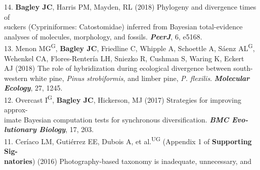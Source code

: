 \documentclass[margin,line]{res}
\begin{document}
\begin{resume}
14. \textbf{Bagley JC}, Harris PM, Mayden, RL (2018) Phylogeny and divergence times of\\
\hspace*{8mm} suckers (Cypriniformes: Catostomidae) inferred from Bayesian total-evidence\\ \vspace{2mm}
\hspace*{8mm}analyses of molecules, morphology, and fossils. {\it \textbf{PeerJ}}, 6, e5168. \\ %
13. Menon MG\textsuperscript{G}, \textbf{Bagley JC}, Friedline C, Whipple A, Schoettle A, S\'{a}enz AL\textsuperscript{G},\\ 
\hspace*{8mm} Wehenkel CA, Flores-Renter\'{i}a LH, Sniezko R, Cushman S, Waring K, Eckert\\
\hspace*{8mm} AJ (2018) The role of hybridization during ecological divergence between south-\\
\hspace*{8mm} western white pine, {\it Pinus strobiformis}, and limber pine, {\it P. flexilis}. {\it \textbf{Molecular}\\ \vspace{2mm}
\hspace*{8mm}\textbf{Ecology}}, 27, 1245. \\ %
12. Overcast I\textsuperscript{G}, \textbf{Bagley JC}, Hickerson, MJ (2017) Strategies for improving approx-\\
\hspace*{8mm} imate Bayesian computation tests for synchronous diversification. {\it \textbf{BMC Evo-}\\ \vspace{2mm}
\hspace*{8mm}\textbf{lutionary Biology}}, 17, 203. \\
11. Cer\'{i}aco LM, Guti\'{e}rrez EE, Dubois A, et al.\textsuperscript{UG} (Appendix 1 of \textbf{Supporting Sig-}\\
\hspace*{8mm} \textbf{natories}) (2016) Photography-based taxonomy is inadequate, unnecessary, and\\ \vspace{2mm}

\end{resume}
\end{document}
